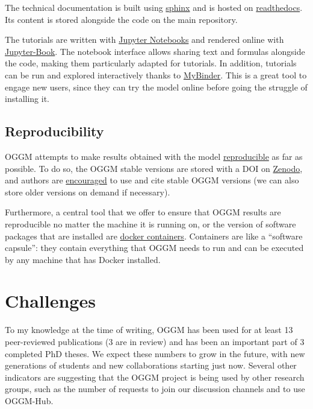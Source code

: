 The technical documentation is built using \href{https://www.sphinx-doc.org}{sphinx} and is hosted
on \href{https://readthedocs.org/}{readthedocs}. Its content is stored alongside the code on the main repository.

The tutorials are written with \href{https://en.wikipedia.org/wiki/Project\_Jupyter\#Jupyter\_Notebook}{Jupyter Notebooks} and
rendered online with \href{https://jupyterbook.org}{Jupyter-Book}. The notebook interface allows sharing text and formulas
alongside the code, making them particularly adapted for tutorials. In addition, tutorials can be run and explored
interactively thanks to \href{https://mybinder.org}{MyBinder}. This is a great tool to engage new users, since they can try
the model online before going the struggle of installing it.


\subsection{Reproducibility}

OGGM attempts to make results obtained with the
model \href{https://en.wikipedia.org/wiki/Reproducibility\#Reproducible\_research}{reproducible} as far as possible. To do so,
the OGGM stable versions are stored with a DOI on \href{https://zenodo.org/record/4546676}{Zenodo}, and authors
are \href{https://docs.oggm.org/en/stable/citing-oggm.html}{encouraged} to use and cite stable OGGM versions (we can also
store older versions on demand if necessary).

Furthermore, a central tool that we offer to ensure that OGGM results are reproducible no matter the machine it is
running on, or the version of software packages that are installed
are \href{https://docs.oggm.org/en/stable/practicalities.html\#singularity-and-docker-containers}{docker containers}.
Containers are like a “software capsule”: they contain everything that OGGM needs to run and can be executed by any
machine that has Docker installed.


\section{Challenges}

To my knowledge at the time of writing, OGGM has been used for at least 13 peer-reviewed publications (3 are in review)
and has been an important part of 3 completed PhD theses. We expect these numbers to grow in the future, with new
generations of students and new collaborations starting just now. Several other indicators are suggesting that the OGGM project is being used by other
research groups, such as the number of requests to join our discussion channels and to use OGGM-Hub.

